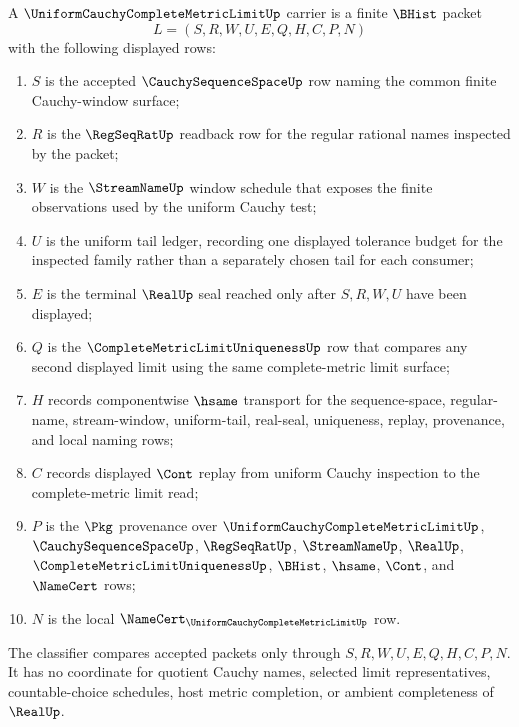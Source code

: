\begin{definition}
\label{def:uniform-cauchy-complete-metric-limit-carrier}
A $\UniformCauchyCompleteMetricLimitUp$ carrier is a finite $\BHist$ packet
$$
L=(S,R,W,U,E,Q,H,C,P,N)
$$
with the following displayed rows:
\begin{enumerate}
\item $S$ is the accepted $\CauchySequenceSpaceUp$ row naming the common finite Cauchy-window surface;
\item $R$ is the $\RegSeqRatUp$ readback row for the regular rational names inspected by the packet;
\item $W$ is the $\StreamNameUp$ window schedule that exposes the finite observations used by the uniform Cauchy test;
\item $U$ is the uniform tail ledger, recording one displayed tolerance budget for the inspected family rather than a separately chosen tail for each consumer;
\item $E$ is the terminal $\RealUp$ seal reached only after $S,R,W,U$ have been displayed;
\item $Q$ is the $\CompleteMetricLimitUniquenessUp$ row that compares any second displayed limit using the same complete-metric limit surface;
\item $H$ records componentwise $\hsame$ transport for the sequence-space, regular-name, stream-window, uniform-tail, real-seal, uniqueness, replay, provenance, and local naming rows;
\item $C$ records displayed $\Cont$ replay from uniform Cauchy inspection to the complete-metric limit read;
\item $P$ is the $\Pkg$ provenance over $\UniformCauchyCompleteMetricLimitUp$, $\CauchySequenceSpaceUp$, $\RegSeqRatUp$, $\StreamNameUp$, $\RealUp$, $\CompleteMetricLimitUniquenessUp$, $\BHist$, $\hsame$, $\Cont$, and $\NameCert$ rows;
\item $N$ is the local $\NameCert_{\UniformCauchyCompleteMetricLimitUp}$ row.
\end{enumerate}
The classifier compares accepted packets only through $S,R,W,U,E,Q,H,C,P,N$. It has no coordinate for quotient Cauchy names, selected limit representatives, countable-choice schedules, host metric completion, or ambient completeness of $\RealUp$.
\end{definition}

